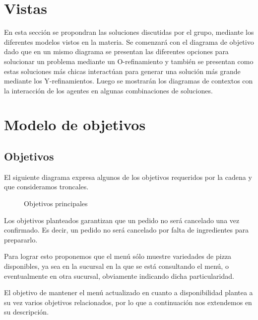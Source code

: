 \documentclass[a4paper,10pt]{article}
\begin{document}
\section*{Vistas}

En esta secci\'on se propondran las soluciones discutidas por el grupo, mediante los diferentes modelos vistos en la materia. Se comenzar\'a con
el diagrama de objetivo dado que en un mismo diagrama se presentan las diferentes opciones para solucionar un problema mediante un
O-refinamiento y tambi\'en se presentan como estas soluciones m\'as chicas interact\'uan para generar una soluci\'on m\'as grande mediante los 
Y-refinamientos. Luego se mostrar\'an los diagramas de contextos con la interacci\'on de los agentes en algunas combinaciones de soluciones.

\section*{Modelo de objetivos}


\subsection*{Objetivos}
\noindent

El siguiente diagrama expresa algunos de los objetivos requeridos por la cadena y que consideramos troncales.

\begin{figure}[H]
\centering
{}
\caption{Objetivos principales}
\end{figure}

Los objetivos planteados garantizan que un pedido no será cancelado una vez confirmado. Es decir, un pedido no será cancelado por falta de ingredientes para prepararlo. 

Para lograr esto proponemos que el menú sólo muestre variedades de pizza disponibles, ya sea en la sucursal en la que se está consultando el menú, o eventualmente en otra sucursal, obviamente indicando dicha particularidad.

El objetivo de mantener el menú actualizado en cuanto a disponibilidad plantea a su vez varios objetivos relacionados, por lo que a continuación nos extendemos en su descripción.
\end{document}
